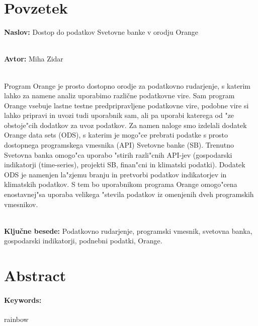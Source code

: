 \chapter*{Povzetek}


\textbf{Naslov:} Dostop do podatkov Svetovne banke v orodju Orange

\ \\
\textbf{Avtor:} Miha Zidar

\ \\
Program Orange je prosto dostopno orodje za podatkovno rudarjenje, s katerim
lahko za namene analiz uporabimo različne podatkovne vire. Sam program Orange
vsebuje lastne testne predpripravljene podatkovne vire, podobne vire si lahko 
pripravi in uvozi tudi uporabnik sam, ali pa uporabi katerega od "ze obstoje"cih
dodatkov za uvoz podatkov. Za namen naloge smo izdelali dodatek Orange data sets (ODS),
s katerim je mogo"ce prebrati podatke s prosto dostopnega programskega vmesnika 
(API) Svetovne banke (SB). Trenutno Svetovna banka omogo"ca uporabo "stirih razli"cnih API-jev
(gospodarski indikatorji (time-series), projekti SB, finan"cni in klimatski podatki). Dodatek ODS
je namenjen la"zjemu branju in pretvorbi podatkov indikatorjev in klimatskih podatkov.
S tem bo uporabnikom programa Orange omogo"cena enostavnej"sa uporaba velikega "stevila
podatkov iz omenjenih dveh programskih vmesnikov.

\ \\
\textbf{Ključne besede:} Podatkovno rudarjenje, programski vmesnik, 
svetovna banka, gospodarski indikatorji, podnebni podatki, Orange. 




\clearemptydoublepage

\chapter*{Abstract}



\subsubsection*{Keywords:}

rainbow

